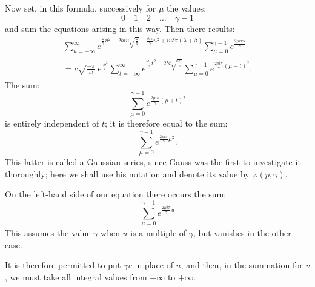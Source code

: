 \documentclass[10pt]{article}
\newcommand{\sourceanchor}[1]{\hypertarget{source-#1}{}}
\begin{document}
Now set, in this formula, successively for \(\mu\) the values:
\[
0\quad 1\quad 2\quad \ldots\quad \gamma-1
\]
and sum the equations arising in this way. Then there results:
\begin{multline*}
\sum_{u=-\infty}^{\infty}
 e^{\frac{\omega}{\gamma}u^{2}+2biu\sqrt{\frac{\omega}{\pi}}-\frac{\delta i\pi}{\gamma}u^{2}+iu\delta\pi(\lambda+\beta)}
\sum_{\mu=0}^{\gamma-1}e^{\frac{2\mu i\pi u}{\gamma}}\\
=c\sqrt{\frac{-\pi}{\omega}}\,e^{\frac{\gamma b^{2}}{\pi}}
\sum_{t=-\infty}^{\infty}e^{\frac{\omega_{1}}{\gamma}t^{2}-2bt\sqrt{\frac{\omega_{1}}{\pi}}}
\sum_{\mu=0}^{\gamma-1}e^{\frac{2p i\pi}{\gamma}(\mu+t)^{2}}.
\end{multline*}
The sum:
\[
\sum_{\mu=0}^{\gamma-1}e^{\frac{2p i\pi}{\gamma}(\mu+t)^{2}}
\]
\sourceanchor{PA14}
is entirely independent of \(t\); it is therefore equal to the sum:
\[
\sum_{\mu=0}^{\gamma-1}e^{\frac{2p i\pi}{\gamma}\mu^{2}}.
\]
This latter is called a Gaussian series, since Gauss was the first to investigate it thoroughly; here we shall use his notation and denote its value by \(\varphi(p,\gamma)\).

On the left-hand side of our equation there occurs the sum:
\[
\sum_{\mu=0}^{\gamma-1}e^{\frac{2\mu i\pi}{\gamma}u}
\]
This assumes the value \(\gamma\) when \(u\) is a multiple of \(\gamma\), but vanishes in the other case.

It is therefore permitted to put \(\gamma v\) in place of \(u\), and then, in the summation for \(v\), we must take all integral values from \(-\infty\) to \(+\infty\).
\end{document}
